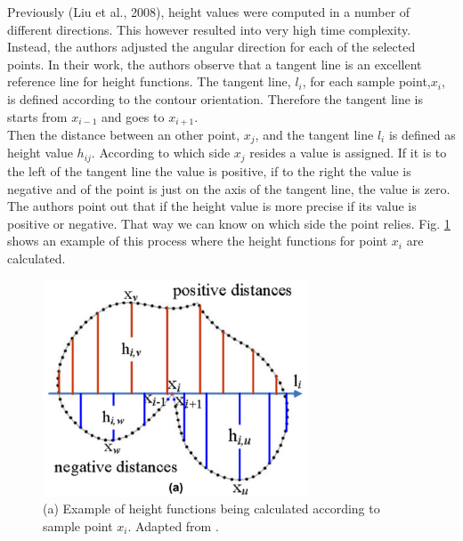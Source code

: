 Previously (Liu et al., 2008), height values were computed in a number of different directions. This however resulted into very high time complexity. Instead, the authors adjusted the angular direction for each of the selected points. In their work, the authors observe that a tangent line is an excellent reference line for height functions. The tangent line, $l_{i}$, for each sample point,$x_{i}$, is defined according to the contour orientation. Therefore the tangent line is starts from $x_{i-1}$ and goes to $x_{i+1}$. \\

Then the distance between an other point, $x_{j}$, and the tangent line $l_{i}$ is defined as height value $h_{ij}$. According to which side $x_{j}$ resides a value is assigned. If it is to the left of the tangent line the value is positive, if to the right the value is negative and of the point is just on the axis of the tangent line, the value is zero. The authors point out that if the height value is more precise if its value is positive or negative. That way we can know on which side the point relies. Fig. \ref{fig:heightfunc} shows an example of this process where the height functions for point $x_{i}$ are calculated.\\

\begin{figure}[h]
        \centering
        \includegraphics[width=0.7\textwidth]{figures/LitreatureReview/heightfunc.png}
        \caption[Example of height functions.]{(a) Example of height functions being calculated according to sample point $x_{i}$. Adapted from \cite{wang}.}
        \label{fig:heightfunc}
\end{figure}

